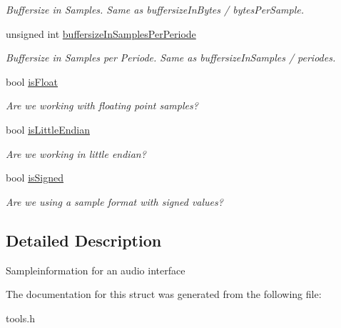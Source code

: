 \begin{DoxyCompactItemize}
\begin{DoxyCompactList}\small\item\em Buffersize in Samples. Same as buffersize\+In\+Bytes / bytes\+Per\+Sample. \end{DoxyCompactList}\item 
\hypertarget{structNl_1_1SampleSpecs__t_a2cfb74483379ae5e1a4cecb6124e6b75}{}unsigned int \hyperlink{structNl_1_1SampleSpecs__t_a2cfb74483379ae5e1a4cecb6124e6b75}{buffersize\+In\+Samples\+Per\+Periode}\label{structNl_1_1SampleSpecs__t_a2cfb74483379ae5e1a4cecb6124e6b75}

\begin{DoxyCompactList}\small\item\em Buffersize in Samples per Periode. Same as buffersize\+In\+Samples / periodes. \end{DoxyCompactList}\item 
\hypertarget{structNl_1_1SampleSpecs__t_a4ff9fec006311fc6d98fcfc210064c16}{}bool \hyperlink{structNl_1_1SampleSpecs__t_a4ff9fec006311fc6d98fcfc210064c16}{is\+Float}\label{structNl_1_1SampleSpecs__t_a4ff9fec006311fc6d98fcfc210064c16}

\begin{DoxyCompactList}\small\item\em Are we working with floating point samples? \end{DoxyCompactList}\item 
\hypertarget{structNl_1_1SampleSpecs__t_a799370916f6269ea80756fb935f91d52}{}bool \hyperlink{structNl_1_1SampleSpecs__t_a799370916f6269ea80756fb935f91d52}{is\+Little\+Endian}\label{structNl_1_1SampleSpecs__t_a799370916f6269ea80756fb935f91d52}

\begin{DoxyCompactList}\small\item\em Are we working in little endian? \end{DoxyCompactList}\item 
\hypertarget{structNl_1_1SampleSpecs__t_acc6694126c92efe0e04968365eef7a9a}{}bool \hyperlink{structNl_1_1SampleSpecs__t_acc6694126c92efe0e04968365eef7a9a}{is\+Signed}\label{structNl_1_1SampleSpecs__t_acc6694126c92efe0e04968365eef7a9a}

\begin{DoxyCompactList}\small\item\em Are we using a sample format with signed values? \end{DoxyCompactList}\end{DoxyCompactItemize}


\subsection{Detailed Description}
Sampleinformation for an audio interface 

The documentation for this struct was generated from the following file\+:\begin{DoxyCompactItemize}
\item 
tools.\+h\end{DoxyCompactItemize}
